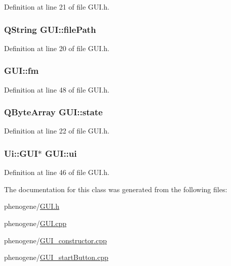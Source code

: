 Definition at line 21 of file G\-U\-I.\-h.

\hypertarget{a00002_a62d0a4c604ed8d65f85455971a938548}{
\subsubsection[{file\-Path}]{\setlength{\rightskip}{0pt plus 5cm}Q\-String G\-U\-I\-::file\-Path\hspace{0.3cm}{\ttfamily [private]}}}\label{d7/d46/a00002_a62d0a4c604ed8d65f85455971a938548}


Definition at line 20 of file G\-U\-I.\-h.

\hypertarget{a00002_a73cc90505024488d2fd77762ad5059c4}{
\subsubsection[{fm}]{ G\-U\-I\-::fm\hspace{0.3cm}{\ttfamily [private]}}}\label{d7/d46/a00002_a73cc90505024488d2fd77762ad5059c4}


Definition at line 48 of file G\-U\-I.\-h.

\hypertarget{a00002_aa3abed87f53b22188d76a134e427b30d}{
\subsubsection[{state}]{\setlength{\rightskip}{0pt plus 5cm}Q\-Byte\-Array G\-U\-I\-::state\hspace{0.3cm}{\ttfamily [private]}}}\label{d7/d46/a00002_aa3abed87f53b22188d76a134e427b30d}


Definition at line 22 of file G\-U\-I.\-h.

\hypertarget{a00002_acdbca1224663f5a19bd1ad4e7c885886}{
\subsubsection[{ui}]{\setlength{\rightskip}{0pt plus 5cm}Ui\-::\-G\-U\-I$\ast$ G\-U\-I\-::ui\hspace{0.3cm}{\ttfamily [private]}}}\label{d7/d46/a00002_acdbca1224663f5a19bd1ad4e7c885886}


Definition at line 46 of file G\-U\-I.\-h.



The documentation for this class was generated from the following files\-:\begin{DoxyCompactItemize}
\item 
phenogene/\hyperlink{a00010}{G\-U\-I.\-h}\item 
phenogene/\hyperlink{a00009}{G\-U\-I.\-cpp}\item 
phenogene/\hyperlink{a00011}{G\-U\-I\-\_\-constructor.\-cpp}\item 
phenogene/\hyperlink{a00012}{G\-U\-I\-\_\-start\-Button.\-cpp}\end{DoxyCompactItemize}
